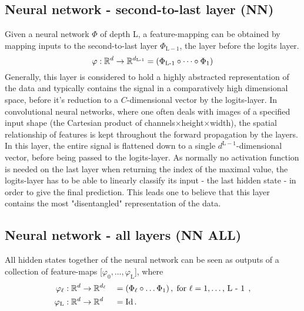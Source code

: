 \subsection{Neural network - second-to-last layer (NN)}

Given a neural network $\Phi$ of depth L,
a feature-mapping can be obtained by mapping inputs to the second-to-last layer $\Phi_{\text{L}-1}$, 
the layer before the logits layer.
\[
    \varphi : \mathbb{R}^d \to \mathbb{R}^{d_\textnormal{L-1}} = (\Phi_\textnormal{L-1} \circ \dots \circ \Phi_1)
\]
Generally, this layer is considered to hold a highly abstracted representation of the data
and typically contains the signal in a comparatively high dimensional space, before it's
reduction to a $C$-dimensional vector by the logits-layer.
In convolutional neural networks, where one often deals with images
of a specified input shape (the Cartesian product of channels$\times$height$\times$width), 
the spatial relationship of features is kept throughout the forward propagation by the layers.
In this layer, the entire signal is flattened down to a single $d^{\text{L}-1}$-dimensional vector, 
before being passed to the logits-layer.
As normally no activation function is needed on the last layer when returning the index of the maximal value, 
the logits-layer has to be able to linearly classify its input - the last hidden state - in order to 
give the final prediction.
This leads one to believe that this layer contains the most "disentangled" representation of the data.


\subsection{Neural network - all layers (NN ALL)}

All hidden states together of the neural network can be seen as outputs of a collection of feature-maps [$\varphi_0, \dots, \varphi_\text{L}$], where
\begin{alignat*}{2}
    \varphi_\ell &: \mathbb{R}^d \to \mathbb{R}^{d_\ell} &&= (\Phi_\ell \circ \dots \Phi_1)
    \,, \; \text{for $\ell = 1, \dots$, L - 1} \;  \,, \\
    \varphi_\textnormal{L} &: \mathbb{R}^d \to \mathbb{R}^d &&= \textnormal{Id} \,.
\end{alignat*}





